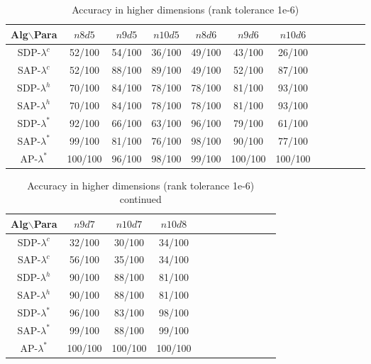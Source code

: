 \documentclass[smallextended, envcountsame]{svjour3}
\begin{document}

    \begin{table}[!htb]
    \caption{Accuracy in higher dimensions (rank tolerance 1e-6)}
    \centering
    \begin{tabular}{cccccccccccc}
    \hline
    Alg$\backslash$Para & $n8d5$ & $n9d5$ & $n10d5$ & $n8d6$ & $n9d6$ & $n10d6$\\ \hline
    SDP-$\lambda^c$ & 52/100 & 54/100 & 36/100 & 49/100 & 43/100 & 26/100\\
    SAP-$\lambda^c$ & 52/100 & 88/100 & 89/100 & 49/100 & 52/100 & 87/100\\
    SDP-$\lambda^h$ & 70/100 & 84/100 & 78/100 & 78/100 & 81/100 & 93/100\\
    SAP-$\lambda^h$ & 70/100 & 84/100 & 78/100 & 78/100 & 81/100 & 93/100\\
    SDP-$\lambda^*$ & 92/100 & 66/100 & 63/100 & 96/100 & 79/100 & 61/100\\
    SAP-$\lambda^*$ & 99/100 & 81/100 & 76/100 & 98/100 & 90/100 & 77/100\\
    AP-$\lambda^*$ & 100/100 & 96/100 & 98/100 & 99/100 & 100/100 & 100/100\\
    \hline
    \end{tabular}
    \end{table}\FloatBarrier

    \begin{table}[!htb]
    \caption{Accuracy in higher dimensions (rank tolerance 1e-6) continued}
    \centering
    \begin{tabular}{cccccccccccc}
    \hline
    Alg$\backslash$Para & $n9d7$ & $n10d7$ & $n10d8$\\ \hline
    SDP-$\lambda^c$ & 32/100 & 30/100 & 34/100\\
    SAP-$\lambda^c$ & 56/100 & 35/100 & 34/100\\
    SDP-$\lambda^h$ & 90/100 & 88/100 & 81/100\\
    SAP-$\lambda^h$ & 90/100 & 88/100 & 81/100\\
    SDP-$\lambda^*$ & 96/100 & 83/100 & 98/100\\
    SAP-$\lambda^*$ & 99/100 & 88/100 & 99/100\\
    AP-$\lambda^*$ & 100/100 & 100/100 & 100/100\\
    \hline
    \end{tabular}
    \end{table}\FloatBarrier
\end{document}
